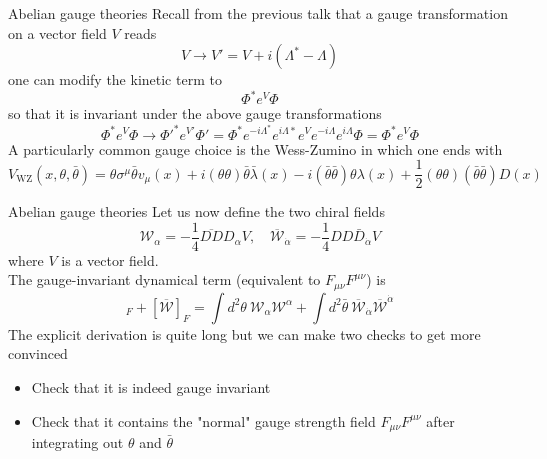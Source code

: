 \documentclass[10pt]{beamer}
\begin{document}
\begin{frame}{Abelian gauge theories}
Recall from the previous talk that a gauge transformation on a vector field $V$ reads
\begin{equation*}
    V \to V' = V + i(\Lambda^* - \Lambda)
\end{equation*}
one can modify the kinetic term to
\begin{equation*}
    \Phi^* e^V \Phi
\end{equation*}
so that it is invariant under the above gauge transformations
\begin{equation*}
    \Phi^*e^V\Phi \to \Phi '^*  e^{V'} \Phi ' = \Phi^*e^{-i\Lambda^*}e^{i\Lambda*}e^Ve^{-i\Lambda}e^{i\Lambda}\Phi = \Phi^*e^V\Phi
\end{equation*}
A particularly common gauge choice is the Wess-Zumino in which one ends with
\begin{equation*}
    V_{\mathrm{WZ}}(x, \theta, \bar{\theta})=\theta \sigma^{\mu} \bar{\theta} v_{\mu}(x)+i(\theta \theta) \bar{\theta} \bar{\lambda}(x)-i(\bar{\theta} \bar{\theta}) \theta \lambda(x)+\frac{1}{2}(\theta \theta)(\bar{\theta} \bar{\theta}) D(x)
\end{equation*}
\end{frame}


\begin{frame}{Abelian gauge theories}
Let us now define the two chiral fields \\
\begin{equation*}
    \mathcal{W}_{\alpha}=-\frac{1}{4} \overline{D D} D_{\alpha} V, \quad \overline{\mathcal{W}}_{\dot{\alpha}} = -\frac{1}{4} D D \bar{D}_{\dot{\alpha}} V
\end{equation*}
where $V$ is a vector field. \\
The gauge-invariant dynamical term (equivalent to $F_{\mu\nu} F^{\mu\nu}$) is 
\begin{equation*}
   [\mathcal{W}]_F + [\overline{\mathcal{W}}]_F = \int d^2\theta \ \mathcal{W}_{\alpha} \mathcal{W}^{\alpha} + \int d^2\bar\theta \ \overline{\mathcal{W}}_{\dot\alpha} \overline{\mathcal{W}}^{\dot\alpha}
\end{equation*}
The explicit derivation is quite long but we can make two checks to get more convinced
\begin{itemize}
    \item Check that it is indeed gauge invariant
    \item Check that it contains the "normal" gauge strength field $F_{\mu\nu}F^{\mu\nu}$ after integrating out $\theta$ and $\bar\theta$
\end{itemize}
\end{frame}
\end{document}
